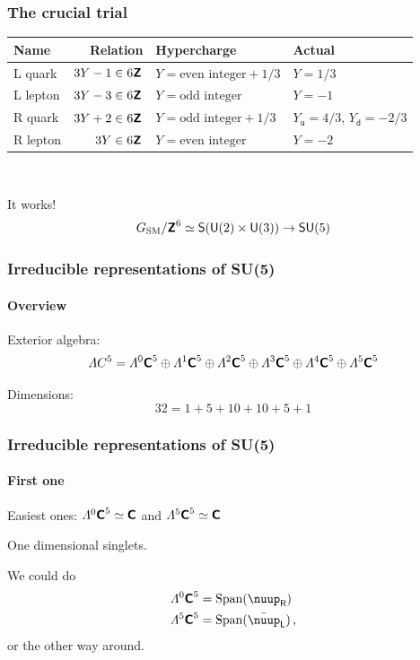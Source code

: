 \documentclass[english, fleqn]{beamer}
\DeclareMathOperator\Span{Span}
\begin{document}
\begin{frame}
    \frametitle{The crucial trial}
    
    \begin{tabular}{lrll}
        \toprule
        Name & Relation & Hypercharge & Actual \\
        \midrule
        L quark & $3Y -1 \in 6 \text{\bfseries\sffamily{Z}}$ & $Y = \text{even integer} + 1/3$ & $Y = 1/3$ \\
        L lepton & $3Y -3 \in 6 \text{\bfseries\sffamily{Z}}$ & $Y = \text{odd integer}$ & $Y = -1$ \\
        R quark & $3Y +2 \in 6 \text{\bfseries\sffamily{Z}}$ & $Y = \text{odd integer} + 1/3$ & $Y_\mathsf u = 4/3$, $Y_\mathsf d = -2/3$ \\
        R lepton & $3Y \in 6 \text{\bfseries\sffamily{Z}}$ & $Y = \text{even integer}$ & $Y = -2$ \\
        \bottomrule
    \end{tabular}

    \

    \pause

    It works!
    \[
        G_\text{SM} / \text{\bfseries\sffamily{Z}}^6 \simeq \mathsf S(\mathsf U(2) \times \mathsf U(3)) \to \mathsf{SU}(5)
    \]
\end{frame}

\begin{frame}
    \frametitle{Irreducible representations of SU(5)}
    \framesubtitle{Overview}

    Exterior algebra:
    \[
        \Lambda C^5 = 
                \Lambda^0 \text{\bfseries\sffamily{C}}^5
                \oplus \Lambda^1 \text{\bfseries\sffamily{C}}^5
                \oplus \Lambda^2 \text{\bfseries\sffamily{C}}^5
                \oplus \Lambda^3 \text{\bfseries\sffamily{C}}^5
                \oplus \Lambda^4 \text{\bfseries\sffamily{C}}^5
                \oplus \Lambda^5 \text{\bfseries\sffamily{C}}^5
    \]

    Dimensions:
    \[
        32 = 1 + 5 + 10 + 10 + 5 + 1
    \]
\end{frame}

\begin{frame}
    \frametitle{Irreducible representations of SU(5)}
    \framesubtitle{First one}

    Easiest ones: $\Lambda^0 \text{\bfseries\sffamily{C}}^5 \simeq \text{\bfseries\sffamily{C}}$ and $\Lambda^5 \text{\bfseries\sffamily{C}}^5 \simeq \text{\bfseries\sffamily{C}}$

    One dimensional singlets.

    We could do
    \begin{align*}
        \Lambda^0 \C^5 &= \Span(\nuup_\mathsf R) \\
        \Lambda^5 \C^5 &= \Span(\bar \nuup_\mathsf L) \,,
    \end{align*}
    or the other way around.
\end{frame}
\end{document}
